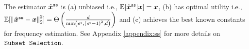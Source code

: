 The estimator $\hat{{\boldsymbol{x}}}^{\texttt{ss}}$ is (a) unbiased i.e., $\mathbb{E}[\hat{{\boldsymbol{x}}}^{\texttt{ss}} | {\boldsymbol{x}}] = {\boldsymbol{x}}$, (b) has optimal utility i.e., $\mathbb{E}[\left\|{\hat{{\boldsymbol{x}}}^{\texttt{ss}} - {\boldsymbol{x}}}\right\|_2^2] = \Theta\left( \frac{d}{\min\left( e^{\varepsilon}, \left( e^{\varepsilon}-1 \right)^2, d \right)}\right)$ and (c) achieves the best known constants for frequency estimation. See Appendix \ref{appendix:ss} for more details on $\texttt{Subset Selection}$.